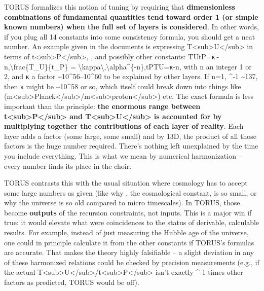 \documentclass[
]{article}
\begin{document}
TORUS formalizes this notion of tuning by requiring that
\textbf{dimensionless combinations of fundamental quantities tend toward
order 1 (or simple known numbers) when the full set of layers is
considered}\hspace{0pt}. In other words, if you plug all 14 constants
into some consistency formula, you should get a neat number. An example
given in the documents is expressing
T\textless sub\textgreater U\textless/sub\textgreater{} in terms of
t\textless sub\textgreater P\textless/sub\textgreater, \alpha, and possibly
other constants: TUtP=κ \alpha-n,\textbackslash frac\{T\_U\}\{t\_P\} =
\textbackslash kappa\textbackslash,\textbackslash alpha\^{}\{-n\},tP\hspace{0pt}TU\hspace{0pt}\hspace{0pt}=κ\alpha-n,
with n an integer 1 or 2, and κ a factor
\textasciitilde10\^{}56--10\^{}60 to be explained by other
layers\hspace{0pt}. If n=1, \alpha\^{}-1 \textasciitilde137, then κ might be
\textasciitilde10\^{}58 or so, which itself could break down into things
like
(m\textless sub\textgreater Planck\textless/sub\textgreater/m\textless sub\textgreater proton\textless/sub\textgreater)
etc. The exact formula is less important than the principle: \textbf{the
enormous range between
t\textless sub\textgreater P\textless/sub\textgreater{} and
T\textless sub\textgreater U\textless/sub\textgreater{} is accounted for
by multiplying together the contributions of each layer of
reality}\hspace{0pt}. Each layer adds a factor (some large, some small)
and by 13D, the product of all those factors is the huge number
required. There's nothing left unexplained by the time you include
everything. This is what we mean by numerical harmonization -- every
number finds its place in the choir.

TORUS contrasts this with the usual situation where cosmology has to
accept some large numbers as given (like why \Lambda, the cosmological
constant, is so small, or why the universe is so old compared to micro
timescales). In TORUS, those become \textbf{outputs} of the recursion
constraints, not inputs\hspace{0pt}. This is a major win if true: it
would elevate what were coincidences to the status of derivable,
calculable results\hspace{0pt}. For example, instead of just measuring
the Hubble age of the universe, one could in principle calculate it from
the other constants if TORUS's formulas are accurate. That makes the
theory highly falsifiable -- a slight deviation in any of these
harmonized relations could be checked by precision measurements (e.g.,
if the actual
T\textless sub\textgreater U\textless/sub\textgreater/t\textless sub\textgreater P\textless/sub\textgreater{}
isn't exactly \alpha\^{}-1 times other factors as predicted, TORUS would be
off).
\end{document}
